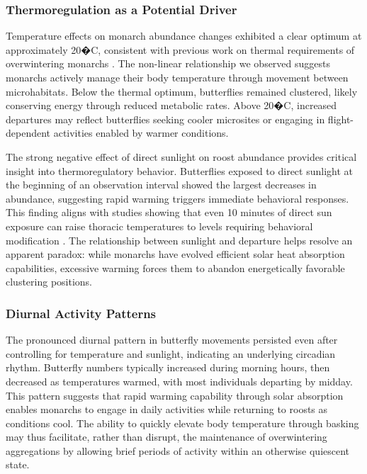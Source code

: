 \subsubsection{Thermoregulation as a Potential Driver}

Temperature effects on monarch abundance changes exhibited a clear optimum at approximately 20�C, consistent with previous work on thermal requirements of overwintering monarchs \autocite{masters_thermal_1988}. The non-linear relationship we observed suggests monarchs actively manage their body temperature through movement between microhabitats. Below the thermal optimum, butterflies remained clustered, likely conserving energy through reduced metabolic rates. Above 20�C, increased departures may reflect butterflies seeking cooler microsites or engaging in flight-dependent activities enabled by warmer conditions.

The strong negative effect of direct sunlight on roost abundance provides critical insight into thermoregulatory behavior. Butterflies exposed to direct sunlight at the beginning of an observation interval showed the largest decreases in abundance, suggesting rapid warming triggers immediate behavioral responses. This finding aligns with studies showing that even 10 minutes of direct sun exposure can raise thoracic temperatures to levels requiring behavioral modification \autocite{masters_thermal_1988}. The relationship between sunlight and departure helps resolve an apparent paradox: while monarchs have evolved efficient solar heat absorption capabilities, excessive warming forces them to abandon energetically favorable clustering positions.

\subsubsection{Diurnal Activity Patterns}

The pronounced diurnal pattern in butterfly movements persisted even after controlling for temperature and sunlight, indicating an underlying circadian rhythm. Butterfly numbers typically increased during morning hours, then decreased as temperatures warmed, with most individuals departing by midday. This pattern suggests that rapid warming capability through solar absorption enables monarchs to engage in daily activities while returning to roosts as conditions cool. The ability to quickly elevate body temperature through basking may thus facilitate, rather than disrupt, the maintenance of overwintering aggregations by allowing brief periods of activity within an otherwise quiescent state.

